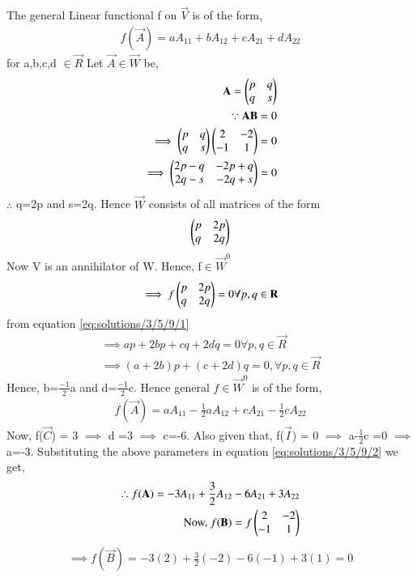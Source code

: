 The general Linear functional f on $\vec{V}$ is of the form,
\begin{align}
f(\vec{A}) = aA_{11}+bA_{12}+cA_{21}+dA_{22}
\label{eq:solutions/3/5/9/1}
\end{align}
for a,b,c,d $\in\vec{R}$
Let $\vec{A} \in \vec{W}$ be,
\begin{align}
\mathbf{A} = \begin{pmatrix}p&q\\q&s\end{pmatrix}\\
\because \mathbf{AB} = 0\\
\implies \begin{pmatrix}p&q\\q&s\end{pmatrix}\begin{pmatrix}2&-2\\-1&1\end{pmatrix} = 0\\
\implies \begin{pmatrix}2p-q&-2p+q\\2q-s&-2q+s\end{pmatrix} = 0
\end{align}
$\therefore$ q=2p and s=2q.
Hence $\vec{W}$ consists of all matrices of the form 
\begin{align}
\begin{pmatrix}p&2p\\q&2q\end{pmatrix}
\end{align}
Now V is an annihilator of W. Hence, f$\in\vec{W}^0$
\begin{align}
\implies f\begin{pmatrix}p&2p\\q&2q\end{pmatrix} = 0 \forall p,q \in \mathbf{R}
\end{align}
from equation \eqref{eq:solutions/3/5/9/1}
\begin{align}
\implies ap+2bp+cq+2dq = 0 \forall p,q \in \vec{R}\\
\implies (a+2b)p + (c+2d)q = 0, \forall p,q \in \vec{R}
\end{align}
Hence, b=$\frac{-1}{2}$a and d=$\frac{-1}{2}$c. Hence general $f\in\vec{W}^0$ is of the form,
\begin{align}
f(\vec{A}) = aA_{11}-\frac{1}{2}a A_{12}+cA_{21}-\frac{1}{2}cA_{22}
\label{eq:solutions/3/5/9/2}
\end{align}
Now, f($\vec{C}$) = 3 $\implies$ d =3 $\implies$ c=-6. Also given that, f($\vec{I}$) = 0 $\implies$ a-$\frac{1}{2}$c =0 $\implies$ a=-3. Substituting the above parameters in equation \eqref{eq:solutions/3/5/9/2} we get,
\begin{align}
\therefore f(\mathbf{A}) = -3A_{11}+\frac{3}{2} A_{12}-6A_{21}+3A_{22} \\
\mbox{Now, } f(\mathbf{B}) = f\begin{pmatrix}2&-2\\-1&1\end{pmatrix} 
\end{align}
\begin{align}
\implies f(\vec{B}) = -3(2)+\frac{3}{2}(-2)-6(-1)+3(1) = 0 
\end{align}
